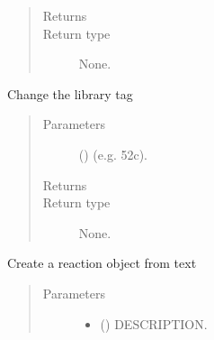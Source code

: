 \documentclass[letterpaper,10pt,english]{sphinxmanual}
\begin{document}
\begin{fulllineitems}
\begin{quote}
\begin{description}
\begin{itemize}
\end{itemize}

\item[{Returns}] \leavevmode
\sphinxAtStartPar


\item[{Return type}] \leavevmode
\sphinxAtStartPar
None.

\end{description}\end{quote}

\begin{fulllineitems}
\label{\detokenize{api/inputgeneration:parsersD1S.Reaction.change_lib}}
\sphinxAtStartPar
Change the library tag
\begin{quote}\begin{description}
\item[{Parameters}] \leavevmode
\sphinxAtStartPar
{} () \textendash{} (e.g. 52c).

\item[{Returns}] \leavevmode
\sphinxAtStartPar


\item[{Return type}] \leavevmode
\sphinxAtStartPar
None.

\end{description}\end{quote}

\end{fulllineitems}


\begin{fulllineitems}
\label{\detokenize{api/inputgeneration:parsersD1S.Reaction.from_text}}
\sphinxAtStartPar
Create a reaction object from text
\begin{quote}\begin{description}
\item[{Parameters}] \leavevmode\begin{itemize}
\item {} 
\sphinxAtStartPar
{} () \textendash{} DESCRIPTION.


\end{itemize}
\end{description}
\end{quote}
\end{fulllineitems}
\end{fulllineitems}
\end{document}
